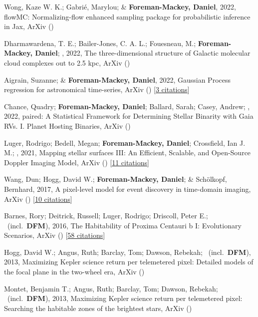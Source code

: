 \item[{\color{numcolor}\scriptsize9}] Wong, Kaze W. K.; Gabri{\'e}, Marylou; \& \textbf{Foreman-Mackey, Daniel}, 2022, flowMC: Normalizing-flow enhanced sampling package for probabilistic inference in Jax, ArXiv ()

\item[{\color{numcolor}\scriptsize8}] Dharmawardena, T. E.; Bailer-Jones, C. A. L.; Fouesneau, M.; \textbf{Foreman-Mackey, Daniel}; \etal, 2022, The three-dimensional structure of Galactic molecular cloud complexes out to 2.5 kpc, ArXiv ()

\item[{\color{numcolor}\scriptsize7}] Aigrain, Suzanne; \& \textbf{Foreman-Mackey, Daniel}, 2022, Gaussian Process regression for astronomical time-series, ArXiv () [\href{https://ui.adsabs.harvard.edu/abs/2022arXiv220908940A}{3 citations}]

\item[{\color{numcolor}\scriptsize6}] Chance, Quadry; \textbf{Foreman-Mackey, Daniel}; Ballard, Sarah; Casey, Andrew; \etal, 2022, paired: A Statistical Framework for Determining Stellar Binarity with Gaia RVs. I. Planet Hosting Binaries, ArXiv ()

\item[{\color{numcolor}\scriptsize5}] Luger, Rodrigo; Bedell, Megan; \textbf{Foreman-Mackey, Daniel}; Crossfield, Ian J. M.; \etal, 2021, Mapping stellar surfaces III: An Efficient, Scalable, and Open-Source Doppler Imaging Model, ArXiv () [\href{https://ui.adsabs.harvard.edu/abs/2021arXiv211006271L}{11 citations}]

\item[{\color{numcolor}\scriptsize4}] Wang, Dun; Hogg, David W.; \textbf{Foreman-Mackey, Daniel}; \& Sch{\"o}lkopf, Bernhard, 2017, A pixel-level model for event discovery in time-domain imaging, ArXiv () [\href{https://ui.adsabs.harvard.edu/abs/2017arXiv171002428W}{10 citations}]

\item[{\color{numcolor}\scriptsize3}] Barnes, Rory; Deitrick, Russell; Luger, Rodrigo; Driscoll, Peter E.; \etal\ (incl.\ \textbf{DFM}), 2016, The Habitability of Proxima Centauri b I: Evolutionary Scenarios, ArXiv () [\href{https://ui.adsabs.harvard.edu/abs/2016arXiv160806919B}{58 citations}]

\item[{\color{numcolor}\scriptsize2}] Hogg, David W.; Angus, Ruth; Barclay, Tom; Dawson, Rebekah; \etal\ (incl.\ \textbf{DFM}), 2013, Maximizing Kepler science return per telemetered pixel: Detailed models of the focal plane in the two-wheel era, ArXiv ()

\item[{\color{numcolor}\scriptsize1}] Montet, Benjamin T.; Angus, Ruth; Barclay, Tom; Dawson, Rebekah; \etal\ (incl.\ \textbf{DFM}), 2013, Maximizing Kepler science return per telemetered pixel: Searching the habitable zones of the brightest stars, ArXiv ()